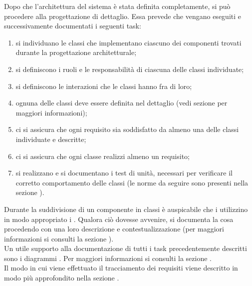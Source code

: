 			Dopo che l'architettura del sistema è stata definita completamente, si può procedere alla progettazione di dettaglio. Essa prevede che vengano eseguiti e successivamente documentati i seguenti task:
			\begin{enumerate}
				\item si individuano le classi che implementano ciascuno dei componenti trovati durante la progettazione architetturale;
				\item si definiscono i ruoli e le responsabilità di ciascuna delle classi individuate;
				\item si definiscono le interazioni che le classi hanno fra di loro;
				\item ognuna delle classi deve essere definita nel dettaglio (vedi sezione  per maggiori informazioni);
				\item ci si assicura che ogni requisito sia soddisfatto da almeno una delle classi individuate e descritte;
				\item ci si assicura che ogni classe realizzi almeno un requisito;
				\item si realizzano e si documentano i test di unità, necessari per verificare il corretto comportamento delle classi (le norme da seguire sono presenti nella sezione ).
			\end{enumerate}
			Durante la suddivisione di un componente in classi è auspicabile che i  utilizzino in modo appropriato i . Qualora ciò dovesse avvenire, si documenta la cosa procedendo con una loro descrizione e contestualizzazione (per maggiori informazioni si consulti la sezione ).\\
			Un utile supporto alla documentazione di tutti i task precedentemente descritti sono i diagrammi . Per maggiori informazioni si consulti la sezione .\\
			Il modo in cui viene effettuato il tracciamento dei requisiti viene descritto in modo più approfondito nella sezione .

